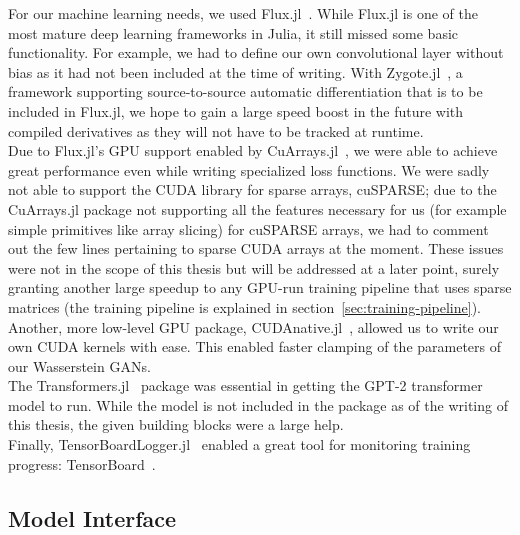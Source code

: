 For our machine learning needs, we used
\mbox{Flux.jl}~\cite{FluxMLFluxJl2019}. While \mbox{Flux.jl} is one of
the most mature deep learning frameworks in Julia, it still missed
some basic functionality. For example, we had to define our own
convolutional layer without bias as it had not been included at the
time of writing. With \mbox{Zygote.jl}~\cite{FluxMLZygoteJl2019}, a
framework supporting source-to-source automatic differentiation that
is to be included in \mbox{Flux.jl}, we hope to gain a large speed
boost in the future with compiled derivatives as they will not have to
be tracked at runtime. \\
Due to \mbox{Flux.jl}'s GPU support enabled by
\mbox{CuArrays.jl}~\cite{JuliaGPUCuArraysJl2019}, we were able to
achieve great performance even while writing specialized loss
functions. We were sadly not able to support the CUDA library for
sparse arrays, cuSPARSE; due to the \mbox{CuArrays.jl} package not
supporting all the features necessary for us (for example simple
primitives like array slicing) for cuSPARSE arrays, we had to comment
out the few lines pertaining to sparse CUDA arrays at the moment.
These issues were not in the scope of this thesis but will be
addressed at a later point, surely granting another large speedup to
any GPU-run training pipeline that uses sparse matrices (the training
pipeline is explained in section~\ref{sec:training-pipeline}). Another,
more low-level GPU package,
\mbox{CUDAnative.jl}~\cite{JuliaGPUCUDAnativeJl2019}, allowed us to
write our own CUDA kernels with ease. This enabled faster clamping of
the parameters of our Wasserstein GANs. \\
The \mbox{Transformers.jl}~\cite{peterChengchingwenTransformersJl2019}
package was essential in getting the \mbox{GPT-2} transformer model to
run. While the model is not included in the package as of the writing
of this thesis, the given building blocks were a large help. \\
Finally,
\mbox{TensorBoardLogger.jl}~\cite{vicentiniPhilipVincTensorBoardLoggerJl2019}
enabled a great tool for monitoring training progress:
TensorBoard~\cite{TensorBoard}.

\subsection{Model Interface}
\label{sec:model-interface}

